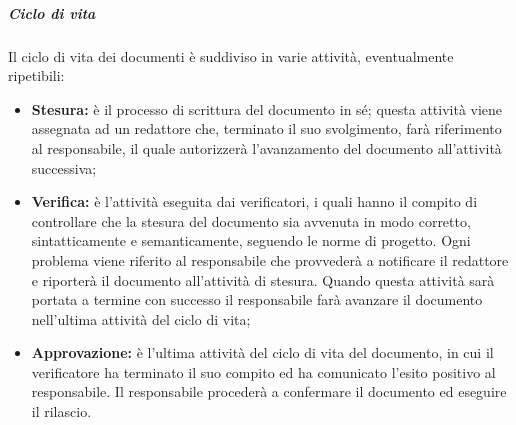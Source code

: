 				\subparagraph{Ciclo di vita}
					Il ciclo di vita dei documenti è suddiviso in varie attività, eventualmente ripetibili:
					\begin{itemize}
						\item \textbf{Stesura:} è il processo di scrittura del documento in sé; questa attività viene assegnata ad un redattore che, terminato il suo svolgimento, farà riferimento al responsabile, il quale autorizzerà l'avanzamento del documento all'attività successiva;
					\item \textbf{Verifica:} è l'attività eseguita dai verificatori, i quali hanno il compito di controllare che la stesura del documento sia avvenuta in modo corretto, sintatticamente e semanticamente, seguendo le norme di progetto. Ogni problema viene riferito al responsabile che provvederà a notificare il redattore e riporterà il documento all'attività di stesura. Quando questa attività sarà portata a termine con successo il responsabile farà avanzare il documento nell'ultima attività del ciclo di vita;
					\item \textbf{Approvazione:} è l'ultima attività del ciclo di vita del documento, in cui il verificatore ha terminato il suo compito ed ha comunicato l'esito positivo al responsabile. Il responsabile procederà a confermare il documento ed eseguire il rilascio.
				\end{itemize}

